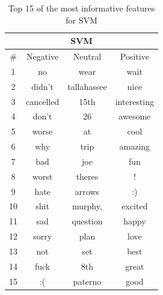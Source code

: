 \begin{table}[!htb]
	\centering
	\begin{tabular}{|c|c|c|c|}
	
		\multicolumn{4}{c}{SVM} \\ \hline
		
		\# & Negative & Neutral & Positive \\ \hline\hline
		
		1 & no  		& wear & wait \\ \hline
		2 & didn't  	& tallahassee & nice \\ \hline
		3 & cancelled  	& 15th & interesting \\ \hline
		4 & don't  		& 26 & awesome \\ \hline
		5 & worse  		& at & cool \\ \hline
		6 & why  		& trip & amazing \\ \hline
		7 & bad  		& joe & fun \\ \hline
		8 & worst  		& theres & ! \\ \hline
		9 & hate  		& arrows & :) \\ \hline
		10 & shit  		& murphy, & excited \\ \hline
		11 & sad  		& question & happy \\ \hline
		12 & sorry  		& plan & love \\ \hline
		13 & not  		& set & best \\ \hline
		14 & fuck  		& 8th & great \\ \hline
		15 & :(  		& paterno & good \\ \hline
	\end{tabular}
	
	\caption[Most informative features for SVM]{Top 15 of the most informative features for SVM}
	\label{tab:informative_features_svm}
\end{table}


